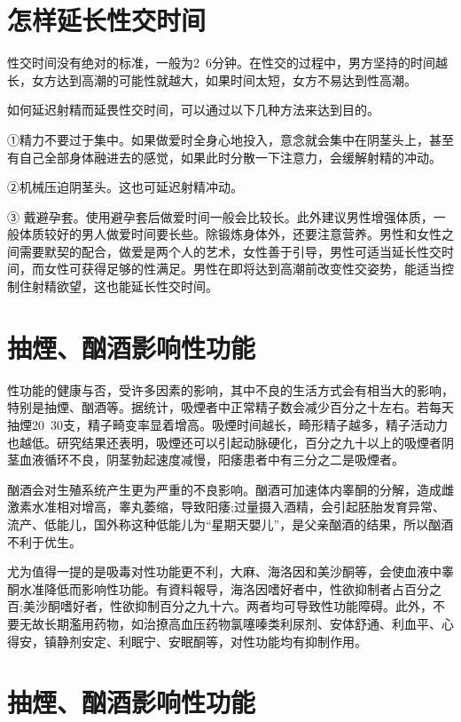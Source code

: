 \documentclass[12pt,UTF8]{ctexbook}
\begin{document}
\section{怎样延长性交时间}

性交时间没有绝对的标准，一般为2~6分钟。在性交的过程中，男方坚持的时间越长，女方达到高潮的可能性就越大，如果时间太短，女方不易达到性高潮。

如何延迟射精而延畏性交时间，可以通过以下几种方法来达到目的。

①精力不要过于集中。如果做爱时全身心地投入，意念就会集中在阴茎头上，甚至有自己全部身体融进去的感觉，如果此时分散一下注意力，会缓解射精的冲动。

②机械压迫阴茎头。这也可延迟射精冲动。

③ 戴避孕套。使用避孕套后做爱时间一般会比较长。此外建议男性增强体质，一般体质较好的男人做爱时间要长些。除锻炼身体外，还要注意营养。男性和女性之间需要默契的配合，做爱是两个人的艺术，女性善于引导，男性可适当延长性交时间，而女性可获得足够的性满足。男性在即将达到高潮前改变性交姿势，能适当控制住射精欲望，这也能延长性交时间。

\section{抽煙、酗酒影响性功能}

性功能的健康与否，受许多因素的影响，其中不良的生活方式会有相当大的影响，特别是抽煙、酗酒等。据统计，吸煙者中正常精子数会减少百分之十左右。若每天抽煙20~30支，精子畸变率显着增高。吸煙时间越长，畸形精子越多，精子活动力也越低。研究结果还表明，吸煙还可以引起动脉硬化，百分之九十以上的吸煙者阴茎血液循环不良，阴茎勃起速度减慢，阳痿患者中有三分之二是吸煙者。

酗酒会对生殖系统产生更为严重的不良影响。酗酒可加速体内睾酮的分解，造成雌激素水准相对增高，睾丸萎缩，导致阳痿;过量摄入酒精，会引起胚胎发育异常、流产、低能儿，国外称这种低能儿为“星期天嬰儿”，是父亲酗酒的结果，所以酗酒不利于优生。

尤为值得一提的是吸毒对性功能更不利，大麻、海洛因和美沙酮等，会使血液中睾酮水准降低而影响性功能。有資料報导，海洛因嗜好者中，性欲抑制者占百分之百;美沙酮嗜好者，性欲抑制百分之九十六。两者均可导致性功能障碍。此外，不要无故长期濫用药物，如治撩高血压药物氯噻嗪类利尿剂、安体舒通、利血平、心得安，镇静剂安定、利眠宁、安眠酮等，对性功能均有抑制作用。

\section{抽煙、酗酒影响性功能}
\end{document}
